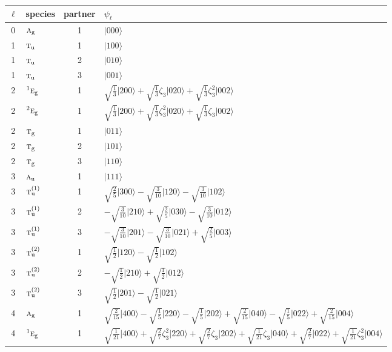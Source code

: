 \documentclass[11pt]{article}
\newcommand{\irr}[1]{\text{\normalfont\scshape #1}}
\newcommand{\conjpair}[1]{{}^{#1}}
\newcommand{\ptag}[1]{\mathrm{#1}}
\newcommand{\rootunity}[1]{\zeta_{#1}}
\newcommand{\occ}[1]{\lvert #1\rangle}
\begin{document}
\begin{longtable}{c l c p{}}\hline $\ell$ & species & partner & $\psi_\ell$\\ \hline\endhead
0 & $\irr{a}_{\ptag{g}}$ & 1 & $\occ{000}$\\
\hline
1 & $\irr{t}_{\ptag{u}}$ & 1 & $\occ{100}$\\
1 & $\irr{t}_{\ptag{u}}$ & 2 & $\occ{010}$\\
1 & $\irr{t}_{\ptag{u}}$ & 3 & $\occ{001}$\\
\hline
2 & $\conjpair{1}\irr{e}_{\ptag{g}}$ & 1 & $\sqrt{\tfrac{1}{3}}\occ{200}+\sqrt{\tfrac{1}{3}}\rootunity{3}\occ{020}+\sqrt{\tfrac{1}{3}}\rootunity{3}^{2}\occ{002}$\\
2 & $\conjpair{2}\irr{e}_{\ptag{g}}$ & 1 & $\sqrt{\tfrac{1}{3}}\occ{200}+\sqrt{\tfrac{1}{3}}\rootunity{3}^{2}\occ{020}+\sqrt{\tfrac{1}{3}}\rootunity{3}\occ{002}$\\
2 & $\irr{t}_{\ptag{g}}$ & 1 & $\occ{011}$\\
2 & $\irr{t}_{\ptag{g}}$ & 2 & $\occ{101}$\\
2 & $\irr{t}_{\ptag{g}}$ & 3 & $\occ{110}$\\
\hline
3 & $\irr{a}_{\ptag{u}}$ & 1 & $\occ{111}$\\
3 & $\irr{t}_{\ptag{u}}^{(1)}$ & 1 & $\sqrt{\tfrac{2}{5}}\occ{300}-\sqrt{\tfrac{3}{10}}\occ{120}-\sqrt{\tfrac{3}{10}}\occ{102}$\\
3 & $\irr{t}_{\ptag{u}}^{(1)}$ & 2 & $-\sqrt{\tfrac{3}{10}}\occ{210}+\sqrt{\tfrac{2}{5}}\occ{030}-\sqrt{\tfrac{3}{10}}\occ{012}$\\
3 & $\irr{t}_{\ptag{u}}^{(1)}$ & 3 & $-\sqrt{\tfrac{3}{10}}\occ{201}-\sqrt{\tfrac{3}{10}}\occ{021}+\sqrt{\tfrac{2}{5}}\occ{003}$\\
3 & $\irr{t}_{\ptag{u}}^{(2)}$ & 1 & $\sqrt{\tfrac{1}{2}}\occ{120}-\sqrt{\tfrac{1}{2}}\occ{102}$\\
3 & $\irr{t}_{\ptag{u}}^{(2)}$ & 2 & $-\sqrt{\tfrac{1}{2}}\occ{210}+\sqrt{\tfrac{1}{2}}\occ{012}$\\
3 & $\irr{t}_{\ptag{u}}^{(2)}$ & 3 & $\sqrt{\tfrac{1}{2}}\occ{201}-\sqrt{\tfrac{1}{2}}\occ{021}$\\
\hline
4 & $\irr{a}_{\ptag{g}}$ & 1 & $\sqrt{\tfrac{2}{15}}\occ{400}-\sqrt{\tfrac{1}{5}}\occ{220}-\sqrt{\tfrac{1}{5}}\occ{202}+\sqrt{\tfrac{2}{15}}\occ{040}-\sqrt{\tfrac{1}{5}}\occ{022}+\sqrt{\tfrac{2}{15}}\occ{004}$\\
4 & $\conjpair{1}\irr{e}_{\ptag{g}}$ & 1 & $\sqrt{\tfrac{1}{21}}\occ{400}+\sqrt{\tfrac{2}{7}}\rootunity{3}^{2}\occ{220}+\sqrt{\tfrac{2}{7}}\rootunity{3}\occ{202}+\sqrt{\tfrac{1}{21}}\rootunity{3}\occ{040}+\sqrt{\tfrac{2}{7}}\occ{022}+\sqrt{\tfrac{1}{21}}\rootunity{3}^{2}\occ{004}$\\

\end{longtable}
\end{document}
